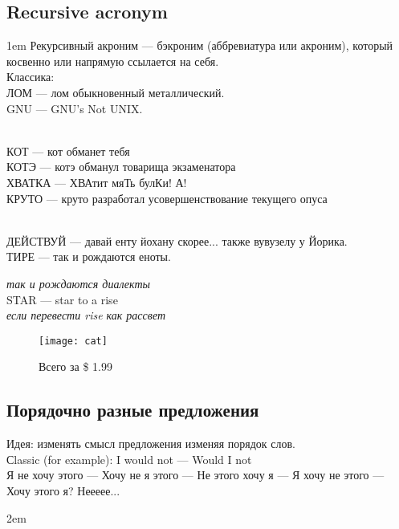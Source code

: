 \subsection{Recursive acronym}
\begin{flushleft}\parskip1em
    Рекурсивный акроним --- бэкроним (аббревиатура или акроним), который косвенно или напрямую ссылается на себя.\\
    Классика:\\
    ЛОМ --- лом обыкновенный металлический.\\
    GNU --- GNU's Not UNIX.

    \emph{}\\
    КОТ --- кот обманет тебя\\
    КОТЭ --- котэ обманул товарища экзаменатора\\
    ХВАТКА --- ХВАтит мяТь булКи! А!\\
    КРУТО --- круто разработал усовершенствование текущего опуса

    \emph{}\\
    ДЕЙСТВУЙ --- давай енту йохану скорее... также вувузелу у Йорика.\\
    ТИРЕ --- так и рождаются еноты.

    \emph{так и рождаются диалекты}\\
    STAR --- star to a rise\\
    \emph{если перевести rise как рассвет}
\end{flushleft}
\begin{figure}[ht!]
    \centering
    \texttt{[image: cat]}
    \caption{Всего за \$ 1.99}
\end{figure}

\subsection{Порядочно разные предложения}
Идея: изменять смысл предложения изменяя порядок слов.\\

Сlassic (for example): I would not --- Would I not\\

Я не хочу этого --- Хочу не я этого --- Не этого хочу я --- Я хочу не этого --- Хочу этого я? Неееее...

\parskip2em


